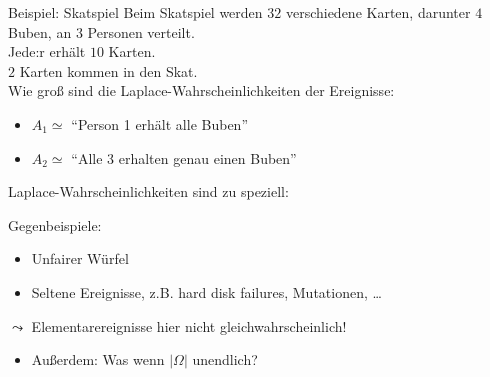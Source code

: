 \documentclass[
  10pt,
  ignorenonframetext,
]{beamer}
\providecommand{\tightlist}{%
  \setlength{\itemsep}{0pt}\setlength{\parskip}{0pt}}
\begin{document}
\begin{frame}{Beispiel: Skatspiel}
\protect\hypertarget{beispiel-skatspiel}{}
Beim Skatspiel werden \(32\) verschiedene Karten, darunter \(4\) Buben,
an \(3\) Personen verteilt.\\
Jede:r erhält \(10\) Karten.\\
\(2\) Karten kommen in den Skat.\\
Wie groß sind die Laplace-Wahrscheinlichkeiten der Ereignisse:

\begin{itemize}
\tightlist
\item
  \(A_1 \simeq\) ``Person 1 erhält alle Buben''
\item
  \(A_2 \simeq\) ``Alle 3 erhalten genau einen Buben''
\end{itemize}

\end{frame}

\begin{frame}{Laplace-Wahrscheinlichkeiten sind zu speziell:}
\protect\hypertarget{laplace-wahrscheinlichkeiten-sind-zu-speziell}{}
\vspace{-1cm}

Gegenbeispiele:

\begin{itemize}
\tightlist
\item
  Unfairer Würfel
\item
  Seltene Ereignisse, z.B. hard disk failures, Mutationen, \ldots{}
\end{itemize}

\(\leadsto\) Elementarereignisse hier nicht gleichwahrscheinlich!

\begin{itemize}
\tightlist
\item
  Außerdem: Was wenn \(|\Omega|\) unendlich?
\end{itemize}
\end{frame}
\end{document}
